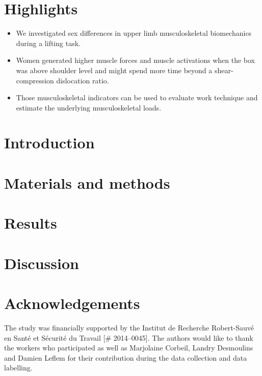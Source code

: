 \documentclass[preprint,review,12pt]{elsarticle}
\begin{document}
    \section{Highlights}\label{sec:highlights}
    \begin{itemize}
        \item We investigated sex differences in upper limb musculoskeletal biomechanics during a lifting task.
        \item Women generated higher muscle forces and muscle activations when the box was above shoulder level and might spend more time beyond a shear-compression dislocation ratio.
        \item Those musculoskeletal indicators can be used to evaluate work technique and estimate the underlying musculoskeletal loads.
    \end{itemize}


    \section{Introduction}\label{sec:introduction}
    

    \section{Materials and methods}\label{sec:materials-and-methods}
    

    \section{Results}\label{sec:results}
    

    \section{Discussion}\label{sec:discussion}
    

    \section{Acknowledgements}\label{sec:acknowledgements}

    The study was financially supported by the Institut de Recherche Robert-Sauvé en Santé et Sécurité du Travail [\# 2014--0045].
    The authors would like to thank the workers who participated as well as Marjolaine Corbeil, Landry Desmoulins and Damien Leflem for their contribution during the data collection and data labelling.

    \appendix
    

    
    
\end{document}
